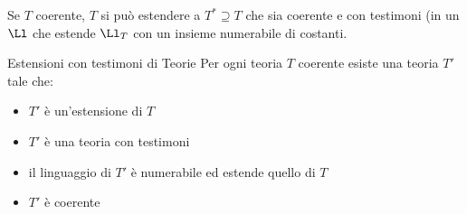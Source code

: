 \documentclass[a4paper,11pt]{report}
\begin{document}
Se \( T \) coerente, \( T \) si può estendere a \( T^* \supseteq T\) che sia coerente e con testimoni (in un \( \Ll \) che estende \( \Ll_T \) con un insieme numerabile di costanti.

\begin{thmframe}{Estensioni con testimoni di Teorie}{}
    Per ogni teoria \( T \) coerente esiste una teoria  \( T' \) tale che:
    \begin{itemize}
        \item \( T' \) è un'estensione di \( T \)
        \item \( T' \) è una teoria con testimoni
        \item il linguaggio di \( T' \) è numerabile ed estende quello di \( T \)
        \item \( T' \) è coerente
    \end{itemize}
    
\end{thmframe}
\end{document}
